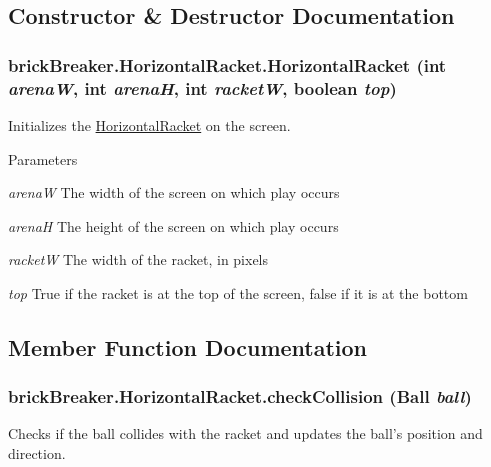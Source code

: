 \subsection{Constructor \& Destructor Documentation}
\hypertarget{classbrick_breaker_1_1_horizontal_racket_aecf9f4abdeda94cc4477603aec0d3640}{
\subsubsection[{HorizontalRacket}]{\setlength{\rightskip}{0pt plus 5cm}brickBreaker.HorizontalRacket.HorizontalRacket (int {\em arenaW}, \/  int {\em arenaH}, \/  int {\em racketW}, \/  boolean {\em top})}}
\label{classbrick_breaker_1_1_horizontal_racket_aecf9f4abdeda94cc4477603aec0d3640}
Initializes the \hyperlink{classbrick_breaker_1_1_horizontal_racket}{HorizontalRacket} on the screen.


\begin{DoxyParams}{Parameters}
\item[{\em arenaW}]The width of the screen on which play occurs \item[{\em arenaH}]The height of the screen on which play occurs \item[{\em racketW}]The width of the racket, in pixels \item[{\em top}]True if the racket is at the top of the screen, false if it is at the bottom \end{DoxyParams}


\subsection{Member Function Documentation}
\hypertarget{classbrick_breaker_1_1_horizontal_racket_a0a504cfa7af83740b19435e73ecd7975}{
\subsubsection[{checkCollision}]{ brickBreaker.HorizontalRacket.checkCollision ({\bf Ball} {\em ball})}}
\label{classbrick_breaker_1_1_horizontal_racket_a0a504cfa7af83740b19435e73ecd7975}
Checks if the ball collides with the racket and updates the ball's position and direction.


